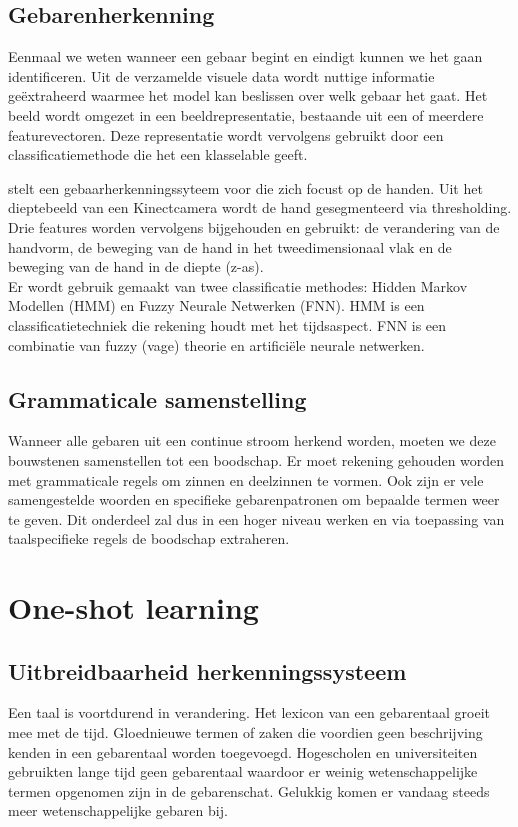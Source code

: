 \subsection{Gebarenherkenning}
Eenmaal we weten wanneer een gebaar begint en eindigt kunnen we het gaan identificeren. Uit de verzamelde visuele data wordt nuttige informatie ge\"extraheerd waarmee het model kan beslissen over welk gebaar het gaat. Het beeld wordt omgezet in een beeldrepresentatie, bestaande uit een of meerdere featurevectoren. Deze representatie wordt vervolgens gebruikt door een classificatiemethode die het een klasselable geeft.

\npar \cite{gesture-FNN-HMM} stelt een gebaarherkenningssyteem voor die zich focust op de handen. Uit het dieptebeeld van een Kinectcamera wordt de hand gesegmenteerd via thresholding. Drie features worden vervolgens bijgehouden en gebruikt: de verandering van de handvorm, de beweging van de hand in het tweedimensionaal vlak en de beweging van de hand in de diepte (z-as).
\\Er wordt gebruik gemaakt van twee classificatie methodes: Hidden Markov Modellen (HMM) en Fuzzy Neurale Netwerken (FNN). HMM is een classificatietechniek die rekening houdt met het tijdsaspect. FNN is een combinatie van fuzzy (vage) theorie en artifici\"ele neurale netwerken.

\subsection{Grammaticale samenstelling}
Wanneer alle gebaren uit een continue stroom herkend worden, moeten we deze bouwstenen samenstellen tot een boodschap. Er moet rekening gehouden worden met grammaticale regels om zinnen en deelzinnen te vormen. Ook zijn er vele samengestelde woorden en specifieke gebarenpatronen om bepaalde termen weer te geven. Dit onderdeel zal dus in een hoger niveau werken en via toepassing van taalspecifieke regels de boodschap extraheren.
%

\section{One-shot learning}

\subsection{Uitbreidbaarheid herkenningssysteem}
Een taal is voortdurend in verandering.
Het lexicon van een gebarentaal groeit mee met de tijd. Gloednieuwe termen of zaken die voordien geen beschrijving kenden in een gebarentaal worden toegevoegd. Hogescholen en universiteiten gebruikten lange tijd geen gebarentaal waardoor er weinig wetenschappelijke termen opgenomen zijn in de gebarenschat. Gelukkig komen er vandaag steeds meer wetenschappelijke gebaren bij.


